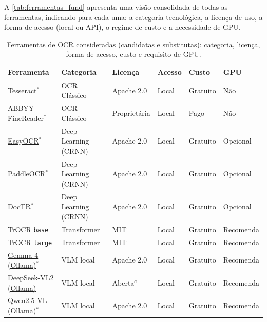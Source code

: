 \documentclass[noabntexcite,oneside]{ufsc-thesis-rn46-2019}
\begin{document}
A \autoref{tab:ferramentas_fund} apresenta uma visão consolidada de todas as
ferramentas, indicando para cada uma: a categoria tecnológica, a licença de uso, a forma
de acesso (local ou API), o regime de custo e a necessidade de GPU.

\begin{table}[htb]
\centering
\caption{Ferramentas de OCR consideradas (candidatas e substitutas): categoria, licença,
forma de acesso, custo e requisito de GPU.}
\label{tab:ferramentas_fund}
\renewcommand{\arraystretch}{1.3}
\small
\begin{tabular}{L{3.4cm} L{2.6cm} L{1.9cm} L{1.2cm} L{1.5cm} L{1.9cm}}
\hline
\textbf{Ferramenta} & \textbf{Categoria} & \textbf{Licença} & \textbf{Acesso}
  & \textbf{Custo} & \textbf{GPU} \\
\hline
\href{https://github.com/tesseract-ocr/tesseract}{Tesseract}$^{*}$
  & OCR Clássico         & Apache 2.0   & Local & Gratuito  & Não \\
ABBYY FineReader$^{*}$
  & OCR Clássico         & Proprietária & Local & Pago      & Não \\
\hline
\href{https://github.com/JaidedAI/EasyOCR}{EasyOCR}$^{*}$ & Deep Learning (CRNN) & Apache 2.0   & Local & Gratuito  & Opcional \\
\href{https://github.com/PaddlePaddle/PaddleOCR}{PaddleOCR}$^{*}$ & Deep Learning (CRNN) & Apache 2.0   & Local & Gratuito  & Opcional \\
\href{https://github.com/mindee/doctr}{DocTR}$^{*}$ & Deep Learning (CRNN) & Apache 2.0   & Local & Gratuito  & Opcional \\
\hline
\href{https://huggingface.co/microsoft/trocr-base-handwritten}{TrOCR \texttt{base}}
  & Transformer          & MIT          & Local & Gratuito  & Recomenda \\
\href{https://huggingface.co/microsoft/trocr-large-handwritten}{TrOCR \texttt{large}}
  & Transformer          & MIT          & Local & Gratuito  & Recomenda \\
\hline
\href{https://ai.google.dev/gemma/docs/core}{Gemma 4 (Ollama)}$^{*}$
  & VLM local            & Apache 2.0   & Local & Gratuito  & Recomenda \\
\href{https://github.com/deepseek-ai/DeepSeek-VL2}{DeepSeek-VL2 (Ollama)}
  & VLM local            & Aberta$^{a}$ & Local & Gratuito  & Recomenda \\
\href{https://github.com/QwenLM/Qwen2.5-VL}{Qwen2.5-VL (Ollama)}$^{*}$
  & VLM local            & Apache 2.0   & Local & Gratuito  & Recomenda \\

\end{tabular}
\end{table}
\end{document}
